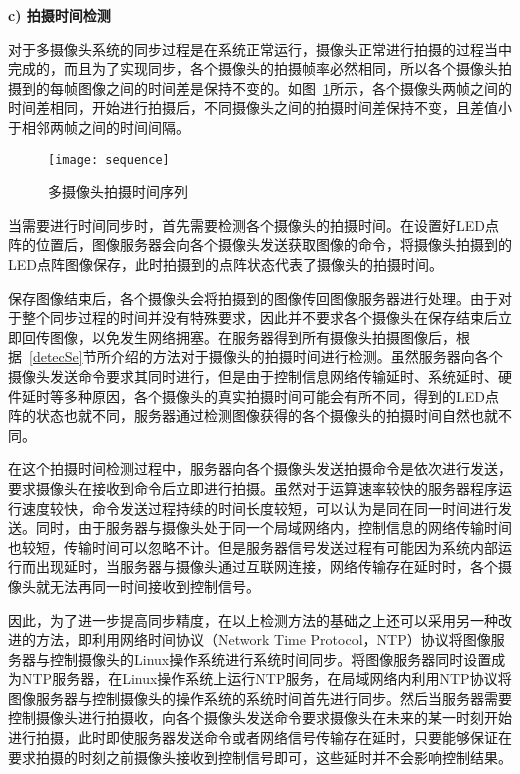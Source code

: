 \textbf{c) 拍摄时间检测}

对于多摄像头系统的同步过程是在系统正常运行，摄像头正常进行拍摄的过程当中完成的，而且为了实现同步，各个摄像头的拍摄帧率必然相同，所以各个摄像头拍摄到的每帧图像之间的时间差是保持不变的。如图~\ref{sequence}所示，各个摄像头两帧之间的时间差相同，开始进行拍摄后，不同摄像头之间的拍摄时间差保持不变，且差值小于相邻两帧之间的时间间隔。

\begin{figure}[h] 
  \centering
  \texttt{[image: sequence]}
  \caption{多摄像头拍摄时间序列}
    \label{sequence}
\end{figure}

当需要进行时间同步时，首先需要检测各个摄像头的拍摄时间。在设置好LED点阵的位置后，图像服务器会向各个摄像头发送获取图像的命令，将摄像头拍摄到的LED点阵图像保存，此时拍摄到的点阵状态代表了摄像头的拍摄时间。

保存图像结束后，各个摄像头会将拍摄到的图像传回图像服务器进行处理。由于对于整个同步过程的时间并没有特殊要求，因此并不要求各个摄像头在保存结束后立即回传图像，以免发生网络拥塞。在服务器得到所有摄像头拍摄图像后，根据~\ref{detecSe}节所介绍的方法对于摄像头的拍摄时间进行检测。虽然服务器向各个摄像头发送命令要求其同时进行，但是由于控制信息网络传输延时、系统延时、硬件延时等多种原因，各个摄像头的真实拍摄时间可能会有所不同，得到的LED点阵的状态也就不同，服务器通过检测图像获得的各个摄像头的拍摄时间自然也就不同。

在这个拍摄时间检测过程中，服务器向各个摄像头发送拍摄命令是依次进行发送，要求摄像头在接收到命令后立即进行拍摄。虽然对于运算速率较快的服务器程序运行速度较快，命令发送过程持续的时间长度较短，可以认为是同在同一时间进行发送。同时，由于服务器与摄像头处于同一个局域网络内，控制信息的网络传输时间也较短，传输时间可以忽略不计。但是服务器信号发送过程有可能因为系统内部运行而出现延时，当服务器与摄像头通过互联网连接，网络传输存在延时时，各个摄像头就无法再同一时间接收到控制信号。

因此，为了进一步提高同步精度，在以上检测方法的基础之上还可以采用另一种改进的方法，即利用网络时间协议（Network Time Protocol，NTP）协议将图像服务器与控制摄像头的Linux操作系统进行系统时间同步。将图像服务器同时设置成为NTP服务器，在Linux操作系统上运行NTP服务，在局域网络内利用NTP协议将图像服务器与控制摄像头的操作系统的系统时间首先进行同步。然后当服务器需要控制摄像头进行拍摄收，向各个摄像头发送命令要求摄像头在未来的某一时刻开始进行拍摄，此时即使服务器发送命令或者网络信号传输存在延时，只要能够保证在要求拍摄的时刻之前摄像头接收到控制信号即可，这些延时并不会影响控制结果。


